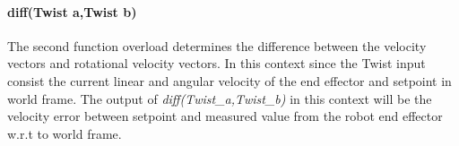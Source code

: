 \documentclass[report.tex]{subfiles}
\begin{document}
    \paragraph{\large{diff(Twist a,Twist b)}\\}
    The second function overload determines the difference between the velocity vectors and rotational velocity vectors. In this context since the Twist input consist the current linear and angular velocity of the end effector and setpoint in world frame. The output of \textit{diff(Twist\_a,Twist\_b)} in this context will be the velocity error between setpoint and measured value from the robot end effector w.r.t to world frame.
\end{document}
